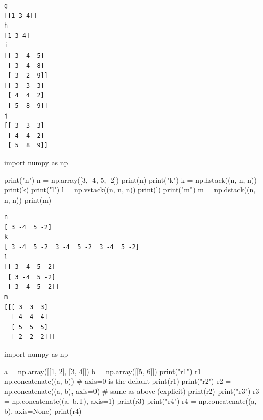 \documentclass[
  polish,
  letterpaper,
  DIV=11,
  numbers=noendperiod]{scrreprt}
\newenvironment{Shaded}{\begin{snugshade}}{\end{snugshade}}
\newcommand{\BuiltInTok}[1]{\textcolor[rgb]{0.00,0.23,0.31}{#1}}
\newcommand{\CommentTok}[1]{\textcolor[rgb]{0.37,0.37,0.37}{#1}}
\newcommand{\DecValTok}[1]{\textcolor[rgb]{0.68,0.00,0.00}{#1}}
\newcommand{\ImportTok}[1]{\textcolor[rgb]{0.00,0.46,0.62}{#1}}
\newcommand{\NormalTok}[1]{\textcolor[rgb]{0.00,0.23,0.31}{#1}}
\newcommand{\OperatorTok}[1]{\textcolor[rgb]{0.37,0.37,0.37}{#1}}
\newcommand{\StringTok}[1]{\textcolor[rgb]{0.13,0.47,0.30}{#1}}
\newcommand{\VariableTok}[1]{\textcolor[rgb]{0.07,0.07,0.07}{#1}}
\begin{document}
\begin{verbatim}
g
[[1 3 4]]
h
[1 3 4]
i
[[ 3  4  5]
 [-3  4  8]
 [ 3  2  9]]
[[ 3 -3  3]
 [ 4  4  2]
 [ 5  8  9]]
j
[[ 3 -3  3]
 [ 4  4  2]
 [ 5  8  9]]
\end{verbatim}

\begin{Shaded}
\begin{Highlighting}[]
\ImportTok{import}\NormalTok{ numpy }\ImportTok{as}\NormalTok{ np}

\BuiltInTok{print}\NormalTok{(}\StringTok{"n"}\NormalTok{)}
\NormalTok{n }\OperatorTok{=}\NormalTok{ np.array([}\DecValTok{3}\NormalTok{, }\OperatorTok{{-}}\DecValTok{4}\NormalTok{, }\DecValTok{5}\NormalTok{, }\OperatorTok{{-}}\DecValTok{2}\NormalTok{])}
\BuiltInTok{print}\NormalTok{(n)}
\BuiltInTok{print}\NormalTok{(}\StringTok{"k"}\NormalTok{)}
\NormalTok{k }\OperatorTok{=}\NormalTok{ np.hstack((n, n, n))}
\BuiltInTok{print}\NormalTok{(k)}
\BuiltInTok{print}\NormalTok{(}\StringTok{"l"}\NormalTok{)}
\NormalTok{l }\OperatorTok{=}\NormalTok{ np.vstack((n, n, n))}
\BuiltInTok{print}\NormalTok{(l)}
\BuiltInTok{print}\NormalTok{(}\StringTok{"m"}\NormalTok{)}
\NormalTok{m }\OperatorTok{=}\NormalTok{ np.dstack((n, n, n))}
\BuiltInTok{print}\NormalTok{(m)}
\end{Highlighting}
\end{Shaded}

\begin{verbatim}
n
[ 3 -4  5 -2]
k
[ 3 -4  5 -2  3 -4  5 -2  3 -4  5 -2]
l
[[ 3 -4  5 -2]
 [ 3 -4  5 -2]
 [ 3 -4  5 -2]]
m
[[[ 3  3  3]
  [-4 -4 -4]
  [ 5  5  5]
  [-2 -2 -2]]]
\end{verbatim}

\begin{Shaded}
\begin{Highlighting}[]
\ImportTok{import}\NormalTok{ numpy }\ImportTok{as}\NormalTok{ np}

\NormalTok{a }\OperatorTok{=}\NormalTok{ np.array([[}\DecValTok{1}\NormalTok{, }\DecValTok{2}\NormalTok{], [}\DecValTok{3}\NormalTok{, }\DecValTok{4}\NormalTok{]])}
\NormalTok{b }\OperatorTok{=}\NormalTok{ np.array([[}\DecValTok{5}\NormalTok{, }\DecValTok{6}\NormalTok{]])}
\BuiltInTok{print}\NormalTok{(}\StringTok{"r1"}\NormalTok{)}
\NormalTok{r1 }\OperatorTok{=}\NormalTok{ np.concatenate((a, b))          }\CommentTok{\# axis=0 is the default}
\BuiltInTok{print}\NormalTok{(r1)}
\BuiltInTok{print}\NormalTok{(}\StringTok{"r2"}\NormalTok{)}
\NormalTok{r2 }\OperatorTok{=}\NormalTok{ np.concatenate((a, b), axis}\OperatorTok{=}\DecValTok{0}\NormalTok{)  }\CommentTok{\# same as above (explicit)}
\BuiltInTok{print}\NormalTok{(r2)}
\BuiltInTok{print}\NormalTok{(}\StringTok{"r3"}\NormalTok{)}
\NormalTok{r3 }\OperatorTok{=}\NormalTok{ np.concatenate((a, b.T), axis}\OperatorTok{=}\DecValTok{1}\NormalTok{)}
\BuiltInTok{print}\NormalTok{(r3)}
\BuiltInTok{print}\NormalTok{(}\StringTok{"r4"}\NormalTok{)}
\NormalTok{r4 }\OperatorTok{=}\NormalTok{ np.concatenate((a, b), axis}\OperatorTok{=}\VariableTok{None}\NormalTok{)}
\BuiltInTok{print}\NormalTok{(r4)}
\end{Highlighting}
\end{Shaded}
\end{document}
